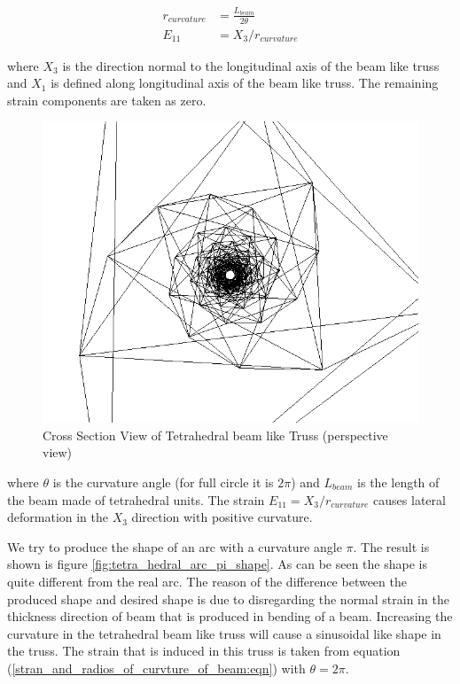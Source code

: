 \begin{equation}
\begin{aligned}
r_{curvature}&=\frac{ L_{beam} }{2 \theta}\\
E_{11}&=X_3/r_{curvature}
\end{aligned}
\label{stran_and_radios_of_curvture_of_beam:eqn}
\end{equation}

where $X_3$ is the direction normal to the longitudinal axis of the beam like truss and $X_1$ is defined along longitudinal axis of the beam like truss. The remaining strain components are taken as zero.

\begin{figure} 
\centering
\includegraphics[width=5.0in]{./chap_5_active_trusses/images_linear_tetrahedral/refrence_shap_100_tetra_unit_tetrahedral_unit_cross_section_view.png}
\caption{Cross Section View of Tetrahedral beam like Truss (perspective view)}
\label{fig:refrence_shap_100_tetra_unit_tetrahedral_unit_cross_section_view}
\end{figure}

where 
$\theta$ is the curvature angle (for full circle it is $2\pi$) and
$ L_{beam}$ is the length of the beam made of tetrahedral units.
The strain $E_{11}=X_3/r_{curvature}$ causes lateral deformation in the $X_3$ direction with positive curvature.


We try to produce the shape of an arc with a curvature angle $\pi$. The result is shown is figure \ref{fig:tetra_hedral_arc_pi_shape}. As can be seen the shape is quite different from the real arc. The reason of the difference between the produced shape and desired shape is due to disregarding the normal strain in the thickness direction of beam that is produced in bending of a beam. Increasing the curvature in the tetrahedral beam like truss will cause a sinusoidal like shape in the truss. The strain that is induced in this truss is taken from equation (\ref{stran_and_radios_of_curvture_of_beam:eqn}) with $\theta=2 \pi$.

